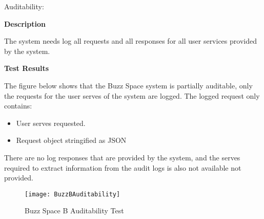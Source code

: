 \newpage
\item Auditability:

\textbf{Description}

The system needs  log all requests and all responses for all user services provided
by the system.

\textbf{Test Results}

The figure below shows that the Buzz Space system is partially auditable, only the requests for the user serves of the system are logged. The logged request only contains:
\begin{itemize}
\item User serves requested.
\item Request object stringified as JSON
\end{itemize}

There are no log responses that are provided by the system, and the serves required to extract information from the audit logs is also not available not provided.

\begin{figure}[h]
  \centering
    \texttt{[image: BuzzBAuditability]}
    \caption{Buzz Space B Auditability Test}
\end{figure}
